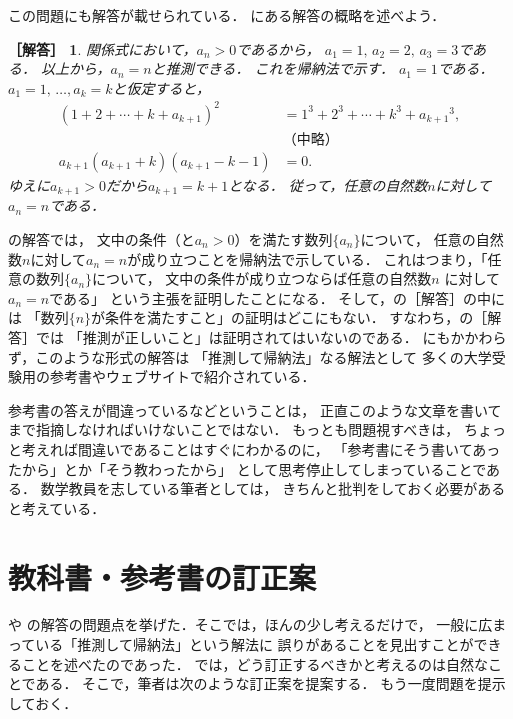 \documentclass[11pt,a4paper]{ltjsarticle} %
\theoremstyle{mystyle} %
\newtheorem*{ans}{［解答］} %
\begin{document}
この問題にも解答が載せられている．
\cite{chert}にある解答の概略を述べよう．

\begin{ans}
	関係式において，$a_n > 0$であるから，
	$a_1=1, \, a_2=2, \, a_3=3$である．
	以上から，$a_n = n$と推測できる．
	これを帰納法で示す．
	$a_1 = 1$である．
	$a_1=1, \, \ldots, a_k = k$と仮定すると，
	\begin{align*}
		(1+2+ \cdots + k + a_{k+1})^2          & = 1^3 + 2^3 + \cdots + k^3 + {a_{k+1}} ^3, \\
		                                       & \text{（中略）}                            \\
		a_{k+1}(a_{k+1} + k) (a_{k+1} - k - 1) & = 0.
	\end{align*}
	ゆえに$a_{k+1} > 0$だから$a_{k+1} = k+1$となる．
	従って，任意の自然数$n$に対して$a_n = n$である．
\end{ans}



の解答では，
文中の条件（と$a_n > 0$）を満たす数列$\{ a_n \}$について，
任意の自然数$n$に対して$a_n = n$が成り立つことを帰納法で示している．
これはつまり，「任意の数列$\{ a_n \}$について，
文中の条件が成り立つならば任意の自然数$n$
に対して$a_n = n$である」
という主張を証明したことになる．
そして，の［解答］の中には
「数列$\{ n \}$が条件を満たすこと」の証明はどこにもない．
すなわち，の［解答］では
「推測が正しいこと」は証明されてはいないのである．
にもかかわらず，このような形式の解答は
「推測して帰納法」なる解法として
多くの大学受験用の参考書やウェブサイトで紹介されている．

参考書の答えが間違っているなどということは，
正直このような文章を書いてまで指摘しなければいけないことではない．
もっとも問題視すべきは，
ちょっと考えれば間違いであることはすぐにわかるのに，
「参考書にそう書いてあったから」とか「そう教わったから」
として思考停止してしまっていることである．
数学教員を志している筆者としては，
きちんと批判をしておく必要があると考えている．


\section{教科書・参考書の訂正案}

や
の解答の問題点を挙げた．そこでは，ほんの少し考えるだけで，
一般に広まっている「推測して帰納法」という解法に
誤りがあることを見出すことができることを述べたのであった．
では，どう訂正するべきかと考えるのは自然なことである．
そこで，筆者は次のような訂正案を提案する．
もう一度問題を提示しておく．
\end{document}
